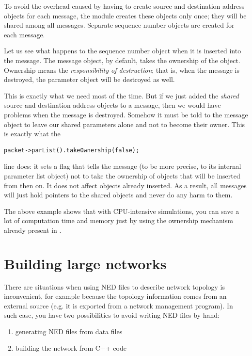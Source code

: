 To avoid the overhead caused by having to create source and
destination address objects for each message, the module creates these
objects only once; they will be shared among all messages. Separate
sequence number objects are created for each message.


Let us see what happens to the sequence number object when it is
inserted into the message. The message object, by default, takes the
ownership of the object. Ownership means the \textit{responsibility of
  destruction}; that is, when the message is destroyed, the parameter
object will be destroyed as well.

This is exactly what we need most of the time. But if we just added
the \textit{shared} source and destination address objects to a
message, then we would have problems when the message is destroyed.
Somehow it must be told to the message object to leave our shared
parameters alone and not to become their
owner. This is exactly what the

\begin{Verbatim}
packet->parList().takeOwnership(false);
\end{Verbatim}


line does: it sets a flag that tells the message (to be more precise,
to its internal parameter list object) not to take the ownership of
objects that will be inserted from then on. It does not affect objects
already inserted. As a result, all messages will just hold pointers to
the shared  objects and never do any harm to them.

The above example shows that with CPU-intensive simulations, you can
save a lot of computation time and memory just by using the ownership
mechanism already present in {\opp}.



\section{Building large networks}

There are situations when using NED files to describe network topology
is inconvenient, for example because the topology information comes
from an external source (e.g. it is
exported from a network management program). In such case, you have
two possibilities to avoid writing NED files by hand:
\begin{enumerate}
\item{generating NED files from data files}
\item{building the network from C++ code}
\end{enumerate}


